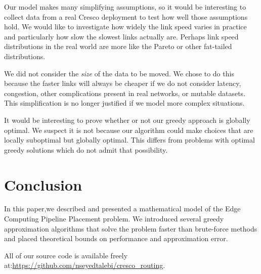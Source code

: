 \documentclass{acmart}
\begin{document}
 	Our model makes many simplifying assumptions, so it would be interesting to collect data from a real Cresco deployment to test how well those assumptions hold. We would like to investigate how widely the link speed varies in practice and particularly how slow the slowest links actually are. Perhaps link speed distributions in the real world are more like the Pareto or other fat-tailed distributions.
 	 
 	 We did not consider the \textit{size} of the data to be moved. We chose to do this because the faster links will always be cheaper if we do not consider latency, congestion, other complications present in real networks, or mutable datasets. This simplification is no longer justified if we model more complex situations.
 	 
 	 It would be interesting to prove whether or not our greedy approach is globally optimal. We suspect it is not because our algorithm could make choices that are locally suboptimal but globally optimal. This differs from problems with optimal greedy solutions which do not admit that possibility.
 	  
 	 \section{Conclusion}
 	 In this paper,we described and presented a mathematical model of the Edge Computing Pipeline Placement problem. We introduced several greedy approximation algorithms that solve the problem faster than brute-force methods and placed theoretical bounds on performance and approximation error.

	All of our source code is available freely at:\url{https://github.com/nseyedtalebi/cresco_routing}.
	
	
	
\end{document}
